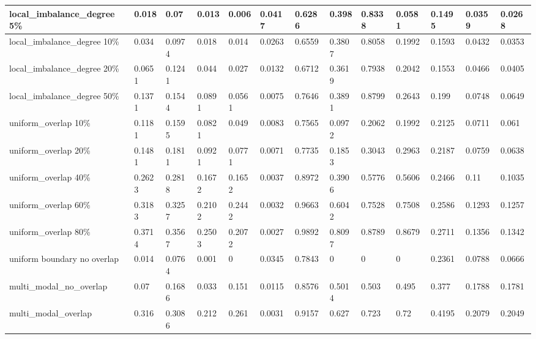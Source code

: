 \begin{landscape}
\begin{table}[htp]
\begin{tabular}{|l|l|l|l|l|l|l|l|l|l|l|l|l|}
            local\_imbalance\_degree 5\% & 0.018 & 0.07 & 0.013 & 0.006 & 0.0417 & 0.6286 & 0.398 & 0.8338 & 0.0581 & 0.1495 & 0.0359 & 0.0268 \\ \hline
            local\_imbalance\_degree 10\% & 0.034 & 0.0974 & 0.018 & 0.014 & 0.0263 & 0.6559 & 0.3807 & 0.8058 & 0.1992 & 0.1593 & 0.0432 & 0.0353 \\ \hline
            local\_imbalance\_degree 20\% & 0.0651 & 0.1241 & 0.044 & 0.027 & 0.0132 & 0.6712 & 0.3619 & 0.7938 & 0.2042 & 0.1553 & 0.0466 & 0.0405 \\ \hline
            local\_imbalance\_degree 50\% & 0.1371 & 0.1544 & 0.0891 & 0.0561 & 0.0075 & 0.7646 & 0.3891 & 0.8799 & 0.2643 & 0.199 & 0.0748 & 0.0649 \\ \hline
            uniform\_overlap 10\% & 0.1181 & 0.1595 & 0.0821 & 0.049 & 0.0083 & 0.7565 & 0.0972 & 0.2062 & 0.1992 & 0.2125 & 0.0711 & 0.061 \\ \hline
            uniform\_overlap 20\% & 0.1481 & 0.1811 & 0.0921 & 0.0771 & 0.0071 & 0.7735 & 0.1853 & 0.3043 & 0.2963 & 0.2187 & 0.0759 & 0.0638 \\ \hline
            uniform\_overlap 40\% & 0.2623 & 0.2818 & 0.1672 & 0.1652 & 0.0037 & 0.8972 & 0.3906 & 0.5776 & 0.5606 & 0.2466 & 0.11 & 0.1035 \\ \hline
            uniform\_overlap 60\% & 0.3183 & 0.3257 & 0.2102 & 0.2442 & 0.0032 & 0.9663 & 0.6042 & 0.7528 & 0.7508 & 0.2586 & 0.1293 & 0.1257 \\ \hline
            uniform\_overlap 80\%& 0.3714 & 0.3567 & 0.2503 & 0.2072 & 0.0027 & 0.9892 & 0.8097 & 0.8789 & 0.8679 & 0.2711 & 0.1356 & 0.1342 \\ \hline
            uniform boundary no overlap & 0.014 & 0.0764 & 0.001 & 0 & 0.0345 & 0.7843 & 0 & 0 & 0 & 0.2361 & 0.0788 & 0.0666 \\ \hline
            multi\_modal\_no\_overlap & 0.07 & 0.1686 & 0.033 & 0.151 & 0.0115 & 0.8576 & 0.5014 & 0.503 & 0.495 & 0.377 & 0.1788 & 0.1781 \\ \hline
            multi\_modal\_overlap & 0.316 & 0.3086 & 0.212 & 0.261 & 0.0031 & 0.9157 & 0.627 & 0.723 & 0.72 & 0.4195 & 0.2079 & 0.2049 \\ \hline
        \end{tabular}
    \end{table}
\end{landscape}

